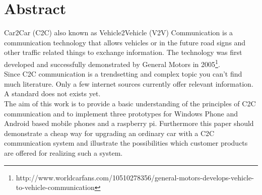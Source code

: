 \chapter{Abstract}
\label{cha:Abstract}
Car2Car (C2C) also known as Vehicle2Vehicle (V2V) Communication is a communication technology that allows vehicles or in the future road signs and other traffic related things to exchange information. The technology was first developed and successfully demonstrated by General Motors in 2005\footnote{http://www.worldcarfans.com/10510278356/general-motors-develops-vehicle-to-vehicle-communication}.
\\
Since C2C communication is a trendsetting and complex topic you can't find much literature. Only a few internet sources currently offer relevant information. A standard does not exists yet.\\
The aim of this work is to provide a basic understanding of the principles of C2C communication and to implement three prototypes for Windows Phone and Android based mobile phones and a raspberry pi. Furthermore this paper should demonstrate a cheap way for upgrading an ordinary car with a C2C communication system and illustrate the possibilities which customer products are offered for realizing such a system.
